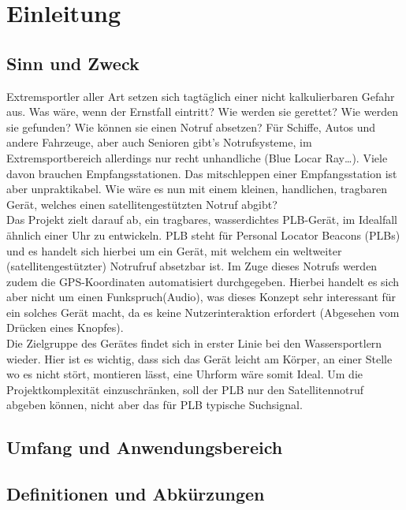 \newpage
\renewcommand*\contentsname{\hfill Inhaltsverzeichnis \hfill} %
\tableofcontents
\newpage

\setcounter{secnumdepth}{3} 		%
\section{Einleitung}
\subsection{Sinn und Zweck}
Extremsportler aller Art setzen sich tagtäglich einer nicht kalkulierbaren Gefahr aus. Was wäre, wenn der Ernstfall eintritt? Wie werden sie gerettet? Wie werden sie gefunden? Wie können sie einen Notruf absetzen? Für Schiffe, Autos und andere Fahrzeuge, aber auch Senioren gibt’s Notrufsysteme, im Extremsportbereich allerdings nur recht unhandliche (Blue Locar Ray…). Viele davon brauchen Empfangsstationen. Das mitschleppen einer Empfangsstation ist aber unpraktikabel. Wie wäre es nun mit einem kleinen, handlichen, tragbaren Gerät, welches einen satellitengestützten Notruf abgibt?\\[12pt]
Das Projekt zielt darauf ab, ein tragbares, wasserdichtes PLB-Gerät, im Idealfall ähnlich einer Uhr zu entwickeln. PLB steht für Personal Locator Beacons (PLBs) und es handelt sich hierbei um ein Gerät, mit welchem ein weltweiter (satellitengestützter) Notrufruf absetzbar ist. Im Zuge dieses Notrufs werden zudem die GPS-Koordinaten automatisiert durchgegeben. Hierbei handelt es sich aber nicht um einen Funkspruch(Audio), was dieses Konzept sehr interessant für ein solches Gerät macht, da es keine Nutzerinteraktion erfordert (Abgesehen vom Drücken eines Knopfes). \\[12pt]Die Zielgruppe des Gerätes findet sich in erster Linie bei den Wassersportlern wieder. Hier ist es wichtig, dass sich das Gerät leicht am Körper, an einer Stelle wo es nicht stört, montieren lässt, eine Uhrform wäre somit Ideal. Um die Projektkomplexität einzuschränken, soll der PLB nur den Satellitennotruf abgeben können, nicht aber das für PLB typische Suchsignal.
\subsection{Umfang und Anwendungsbereich}

\subsection{Definitionen und Abkürzungen}

